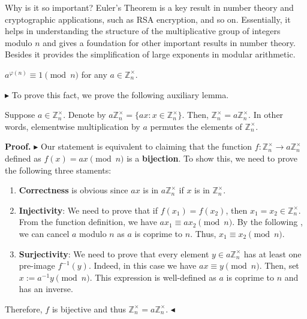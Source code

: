 \documentclass[../lecture-notes-148x210.tex]{subfiles}
\begin{document}
Why is it so important? Euler's Theorem is a key result in number theory and 
cryptographic applications, such as RSA encryption, and so on. 
Essentially, it helps in understanding the structure of the multiplicative group of 
integers modulo $n$ and gives a foundation for other important results in number theory. 
Besides it provides the simplification of large exponents in modular arithmetic. 

\begin{theorem}[Euler's] \label{th:euler_theorem}
    $a^{\varphi(n)} \equiv 1 \pmod{n}$ for any $a \in \mathbb{Z}_n^{\times}$.
\end{theorem}

$\blacktriangleright$ To prove this fact, we prove the following auxiliary lemma.

\begin{lemma}
    Suppose $a \in \mathbb{Z}_n^{\times}$. Denote by $a\mathbb{Z}_n^{\times} =
    \{ax: x \in \mathbb{Z}_n^{\times}\}$. Then, $\mathbb{Z}_n^{\times} =
    a\mathbb{Z}_n^{\times}$. In other words, elementwise multiplication by $a$
    permutes the elements of $\mathbb{Z}_n^{\times}$.
\end{lemma}

\textbf{Proof.} $\blacktriangleright$ Our statement is equivalent to claiming that the 
function $f: \mathbb{Z}_n^{\times} \to a\mathbb{Z}_n^{\times}$ defined 
as $f(x) = ax \pmod{n}$ is a \textbf{bijection}. To show this, we need to prove the following 
three staments:
\begin{enumerate}
    \item \textbf{Correctness} is obvious since $ax$ is in $a\mathbb{Z}_n^{\times}$ if $x$ is in $\mathbb{Z}_n^{\times}$.
    \item \textbf{Injectivity}: We need to prove that if $f(x_1)=f(x_2)$, 
    then $x_1=x_2 \in \mathbb{Z}_n^{\times}$. 
    From the function definition, we have $ax_1 \equiv ax_2 \pmod{n}$. By the following 
    , we can cancel $a$ modulo $n$ as $a$ is coprime to $n$. 
    Thus, $x_1 \equiv x_2 \pmod{n}$.
    \item \textbf{Surjectivity}: We need to prove that every element $y \in a\mathbb{Z}_n^{\times}$ has at least 
    one pre-image $f^{-1}(y)$. Indeed, in this case we have $ax \equiv y \pmod{n}$. Then, set $x := a^{-1}y \pmod {n}$. This 
    expression is well-defined as $a$ is coprime to $n$ and has an inverse.
\end{enumerate}

Therefore, $f$ is bijective and thus $\mathbb{Z}_n^{\times} = a\mathbb{Z}_n^{\times}$.
$\blacktriangleleft$
\end{document}
